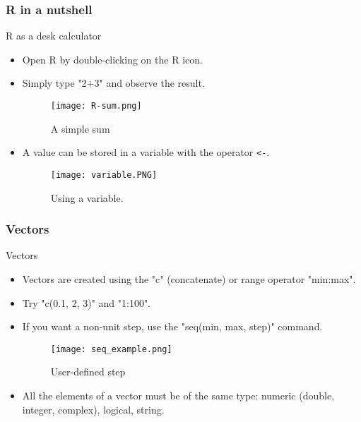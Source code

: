 \documentclass[main.tex]{subfiles}
\begin{document}
\begin{frame}
    \frametitle{R in a nutshell}
\begin{block}{R as a desk calculator}
    \begin{itemize}
        \item<+-> Open R by double-clicking on the R icon.
        \item<+-> Simply type "2+3" and observe the result.
        \begin{figure}[htbp]
            \centering
            \texttt{[image: R-sum.png]}
            \caption{A simple sum}
            \label{<label>}
        \end{figure}
        \item<+-> A value  can be stored in
        a variable with the operator \texttt{<-}.
        \begin{figure}[htbp]
            \centering
            \texttt{[image: variable.PNG]}
            \caption{Using a variable.}
            \label{fig:variable}
        \end{figure}
    \end{itemize}
\end{block}
\end{frame}
\begin{frame}
    \frametitle{Vectors}
\begin{block}{Vectors}
    \begin{itemize}
        \item<+-> Vectors are created using the "c" (concatenate) or range operator "min:max".
        \item<+-> Try "c(0.1, 2, 3)" and "1:100".
        \item<+-> If you want a non-unit step, use the "seq(min, max, step)" command.
        \begin{figure}[htbp]
            \centering
            \texttt{[image: seq\_example.png]}
            \caption{User-defined step}
            \label{fig:arbitrary_range}
        \end{figure}
        \item<+-> All the elements of a vector must be of the same type:
        numeric (double, integer, complex), logical, string.
    \end{itemize}
\end{block}
\end{frame}
\end{document}
